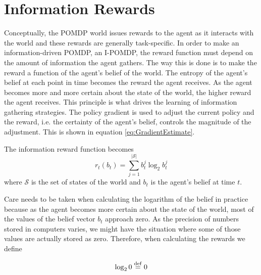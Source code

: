 \section{Information Rewards}
\label{sec:InformationRewards}
Conceptually, the POMDP world issues rewards to the agent as it interacts with the world and these rewards are generally task-specific. In order to make an information-driven POMDP, an I-POMDP, the reward function must depend on the amount of information the agent gathers. The way this is done is to make the reward a function of the agent's belief of the world. The entropy of the agent's belief at each point in time becomes the reward the agent receives. As the agent becomes more and more certain about the state of the world, the higher reward the agent receives. This principle is what drives the learning of information gathering strategies. The policy gradient is used to adjust the current policy and the reward, i.e. the certainty of the agent's belief, controls the magnitude of the adjustment. This is shown in equation \eqref{eq:GradientEstimate}.

The information reward function becomes
\begin{equation}
\label{eq:InformationRewards}
  r_t(b_t) = \sum_{j=1}^{|\mathcal{S}|} b_t^j \log_2{b_t^j}
\end{equation}
where $\mathcal{S}$ is the set of states of the world and $b_t$ is the agent's belief at time $t$.

Care needs to be taken when calculating the logarithm of the belief in practice because as the agent becomes more certain about the state of the world, most of the values of the belief vector $b_t$ approach zero. As the precision of numbers stored in computers varies, we might have the situation where some of those values are actually stored as zero. Therefore, when calculating the rewards we define

\begin{equation}
  \log_2{0} \stackrel{\mathrm{def}}{=} 0
\end{equation}
